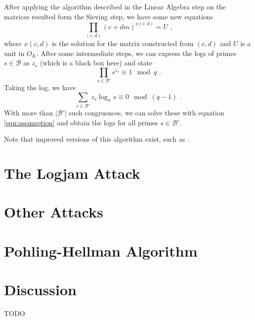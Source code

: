 \documentclass[paper=a4, fontsize=11pt]{scrartcl} %
\numberwithin{equation}{section} %
\numberwithin{figure}{section} %
\numberwithin{table}{section} %
\begin{document}
After applying the algorithm described in the Linear Algebra step on the matrices resulted form the Sieving step, we have some new equations
\begin{equation}
\prod_{(c,d)}(c+dm)^{x(c,d)} = U
\textit{ ,}
\end{equation}
where $x(c,d)$ is the solution for the matrix constructed from $(c,d)$ and $U$ is a unit in $O_K$. After some intermediate steps, we can express the logs of primes $s\in\mathcal{B}$ as $z_s$ (which is a black box here) and state
\begin{equation}
\prod_{s\in\mathcal{B}'}s^{z_s}\equiv 1\mod q
\text{ .}
\end{equation}
Taking the log, we have
\begin{equation}
\sum_{s\in\mathcal{B}'}z_s\log_\alpha s \equiv 0 \mod (q-1)
\text{ .}
\end{equation}
With more than $|\mathcal{B}'|$ such congruences, we can solve these with equation \ref{eqn:assumption} and obtain the logs for all primes $s\in\mathcal{B}'$.

Note that improved versions of this algorithm exist, such as \citep{joux2003improvements}.

\section{The Logjam Attack}



\section{Other Attacks}

\section{Pohling-Hellman Algorithm}

\section{Discussion}
TODO

\newpage


\end{document}
